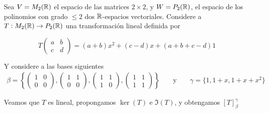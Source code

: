 \begin{eg}
    Sea $V = M_2(\mathbb{R})$ el espacio de las matrices $2 \times 2$, y $W = P_2(\mathbb{R})$, el espacio de los polinomios con grado $\leqslant 2$ dos $\mathbb{R}$-espacios vectoriales. Considere a $T : M_2(\mathbb{R}) \to P_2(\mathbb{R})$ una transformación lineal definida por 

    $$T\begin{pmatrix}
    a & b \\
    c & d
    \end{pmatrix} = (a+b)x^2 + (c-d)x + (a+b+c-d)1$$

    Y considere a las bases siguientes
    \begin{align*}
      \beta = \left\{ \begin{pmatrix} 1 & 0 \\ 0 & 0 \end{pmatrix}, \begin{pmatrix} 1 & 1 \\ 0 & 0 \end{pmatrix}, \begin{pmatrix} 1 & 1 \\ 1 & 0 \end{pmatrix}, \begin{pmatrix} 1 & 1 \\ 1 & 1 \end{pmatrix}\right\}  && \text{ y } && \gamma = \{ 1, 1+x, 1+x+x^2\}
    \end{align*}

    Veamos que $T$ es lineal, propongamos $\ker(T)$ e $\Im(T)$, y obtengamos ${\left[ T \right]}_{\beta}^{\gamma}$
\end{eg}


